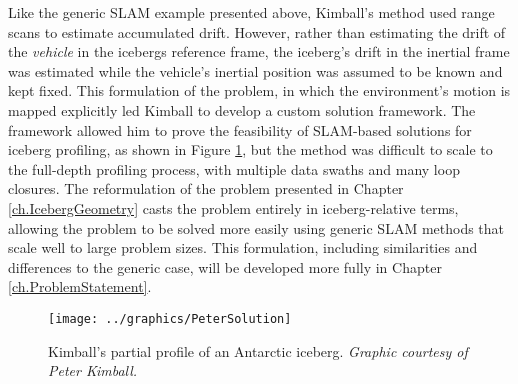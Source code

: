 Like the generic SLAM example presented above, Kimball's method used range scans to estimate accumulated drift. However, rather than estimating the drift of the \emph{vehicle} in the icebergs reference frame, the iceberg's drift in the inertial frame was estimated while the vehicle's inertial position was assumed to be known and kept fixed. This formulation of the problem, in which the environment's motion is mapped explicitly led Kimball to develop a custom solution framework. The framework allowed him to prove the feasibility of SLAM-based solutions for iceberg profiling, as shown in Figure \ref{fig:KimballSolution}, but the method was difficult to scale to the full-depth profiling process, with multiple data swaths and many loop closures. The reformulation of the problem presented in Chapter \ref{ch.IcebergGeometry} casts the problem entirely in iceberg-relative terms, allowing the problem to be solved more easily using generic SLAM methods that scale well to large problem sizes. This formulation, including similarities and differences to the generic case, will be developed more fully in Chapter \ref{ch.ProblemStatement}.

 \begin{figure}[!htb]
   \centering
   \texttt{[image: ../graphics/PeterSolution]} %
   \caption{Kimball's partial profile of an Antarctic iceberg. \emph{Graphic courtesy of Peter Kimball.}}
   \label{fig:KimballSolution}
\end{figure}


